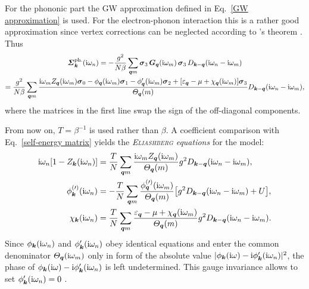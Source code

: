 For the phononic part the GW approximation defined in Eq.~\ref{GW approximation}
is used. For the electron-phonon interaction this is a rather good approximation
since vertex corrections can be neglected according to 's theorem
\cite{Migdal58}. Thus
%
\begin{multline*}
    \boldsymbol {\varSigma}_{\boldsymbol k} \sp{\text{ph.}} (\mathrm i \omega_n)
    = -\frac{g^2}{N \beta} \sum_{\boldsymbol q m}
    \boldsymbol \sigma_3 \, \boldsymbol G_{\boldsymbol q}(\mathrm i \omega_m) \, \boldsymbol \sigma_3 \,
    D_{\boldsymbol k - \boldsymbol q}(\mathrm i \omega_n - \mathrm i \omega_m)
    \\
    = \frac{g^2}{N \beta} \sum_{\boldsymbol q m}
    \frac { \mathrm i \omega_m
              Z_{\boldsymbol q}(\mathrm i \omega_m) \boldsymbol \sigma_0
        - \phi _{\boldsymbol q}(\mathrm i \omega_m) \boldsymbol \sigma_1
        - \phi'_{\boldsymbol q}(\mathrm i \omega_m) \boldsymbol \sigma_2
        + [\varepsilon_{\boldsymbol q} - \mu + \chi_{\boldsymbol q}(\mathrm i \omega_m)] \boldsymbol \sigma_3 }
        {\varTheta_{\boldsymbol q}(m)}
    D_{\boldsymbol k - \boldsymbol q}(\mathrm i \omega_n - \mathrm i \omega_m),
\end{multline*}
%
where the  matrices in the first line swap the sign of the
off-diagonal components.

From now on, $T = \beta^{-1}$ is used rather than $\beta$. A coefficient
comparison with Eq.~\ref{self-energy matrix} yields the
\emph{\textsc{Eliashberg} equations} \cite{Eliashberg60} for the
 model:
%
\begin{subequations}
    \begin{align}
        \mathrm i \omega_n [1 - Z_{\boldsymbol k}(\mathrm i \omega_n)] &= \frac T N
        \sum_{\boldsymbol q m} \frac
            {\mathrm i \omega_m Z_{\boldsymbol q}(\mathrm i \omega_m)}
            {\varTheta_{\boldsymbol q}(m)}
        g^2 D_{\boldsymbol k - \boldsymbol q}(\mathrm i \omega_n - \mathrm i \omega_m),
        \\
        \phi^{(\prime)}_{\boldsymbol k}(\mathrm i \omega_n) &= -\frac T N
        \sum_{\boldsymbol q m} \frac
            {\phi^{(\prime)}_{\boldsymbol q}(\mathrm i \omega_m)}
            {\varTheta_{\boldsymbol q}(m)}
        \big[ g^2 D_{\boldsymbol k - \boldsymbol q}(\mathrm i \omega_n - \mathrm i \omega_m) + U \big],
        \\
        \chi_{\boldsymbol k}(\mathrm i \omega_n) &= \frac T N
        \sum_{\boldsymbol q m} \frac
            {\varepsilon_{\boldsymbol q} - \mu + \chi_{\boldsymbol q}(\mathrm i \omega_m)}
            {\varTheta_{\boldsymbol q}(m)}
        g^2 D_{\boldsymbol k - \boldsymbol q}(\mathrm i \omega_n - \mathrm i \omega_m).
    \end{align}
\end{subequations}
%
Since $\phi_{\boldsymbol k}(\mathrm i \omega_n)$ and $\phi'_{\boldsymbol k}(\mathrm i \omega_n)$ obey
identical equations and enter the common denominator $\varTheta_{\boldsymbol q}(\mathrm i
\omega_m)$ only in form of the absolute value $|\phi_{\boldsymbol k}(\mathrm i \omega) - \mathrm i
\phi'_{\boldsymbol k}(\mathrm i \omega_n)|^2$, the phase of $\phi_{\boldsymbol k}(\mathrm i \omega) - \mathrm i
\phi'_{\boldsymbol k}(\mathrm i \omega_n)$ is left undetermined. This gauge invariance allows
to set $\phi'_{\boldsymbol k}(\mathrm i \omega_n) = 0$ \cites[37]{AllenMitrovic82}[around
Eq.~2.20]{Nambu60}.

